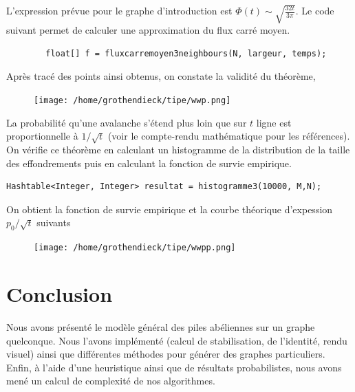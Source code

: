 \documentclass{article}
\begin{document}
L'expression prévue pour le graphe d'introduction est $\Phi(t) \sim \sqrt{\frac{32 t}{3\pi}}$. Le code suivant permet de calculer une approximation du flux carré moyen.  
\begin{lstlisting}
        float[] f = fluxcarremoyen3neighbours(N, largeur, temps);
\end{lstlisting}

Après tracé des points ainsi obtenus, on constate la validité du théorème, 
\begin{figure}[h]
	\centering
	\texttt{[image: /home/grothendieck/tipe/wwp.png]}
\end{figure}

La probabilité qu'une avalanche s'étend plus loin que sur $t$ ligne est proportionnelle à $1/\sqrt{t}$ (voir le compte-rendu mathématique pour les références). On vérifie ce théorème en calculant un histogramme de la distribution de la taille des effondrements puis en calculant la fonction de survie empirique.
\begin{lstlisting}
Hashtable<Integer, Integer> resultat = histogramme3(10000, M,N);
\end{lstlisting}

On obtient la fonction de survie empirique et la courbe théorique d'expession $p_0/\sqrt{t}$ suivants
\begin{figure}[h]
	\centering
	\texttt{[image: /home/grothendieck/tipe/wwpp.png]}
\end{figure}
\section{Conclusion}
Nous avons présenté le modèle général des piles abéliennes sur un graphe quelconque. Nous l'avons implémenté (calcul de stabilisation, de l'identité, rendu visuel) ainsi que différentes méthodes pour générer des graphes particuliers. Enfin, à l'aide d'une heuristique ainsi que de résultats probabilistes, nous avons mené un calcul de complexité de nos algorithmes.
\end{document}
